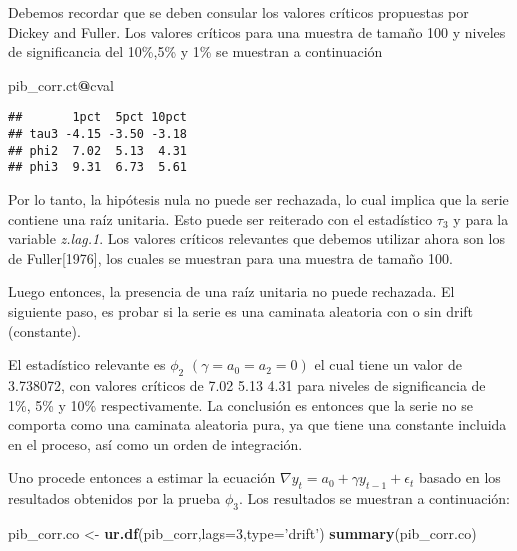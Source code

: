 \documentclass[]{book}
\newenvironment{Shaded}{\begin{snugshade}}{\end{snugshade}}
\newcommand{\KeywordTok}[1]{\textcolor[rgb]{0.13,0.29,0.53}{\textbf{#1}}}
\newcommand{\DataTypeTok}[1]{\textcolor[rgb]{0.13,0.29,0.53}{#1}}
\newcommand{\DecValTok}[1]{\textcolor[rgb]{0.00,0.00,0.81}{#1}}
\newcommand{\StringTok}[1]{\textcolor[rgb]{0.31,0.60,0.02}{#1}}
\newcommand{\OperatorTok}[1]{\textcolor[rgb]{0.81,0.36,0.00}{\textbf{#1}}}
\newcommand{\NormalTok}[1]{#1}
\theoremstyle{definition}
\theoremstyle{definition}
\theoremstyle{definition}
\theoremstyle{remark}
\begin{document}
Debemos recordar que se deben consular los valores críticos propuestas
por Dickey and Fuller. Los valores críticos para una muestra de tamaño
100 y niveles de significancia del 10\%,5\% y 1\% se muestran a
continuación

\begin{Shaded}
\begin{Highlighting}[]
\NormalTok{pib_corr.ct}\OperatorTok{@}\NormalTok{cval}
\end{Highlighting}
\end{Shaded}

\begin{verbatim}
##       1pct  5pct 10pct
## tau3 -4.15 -3.50 -3.18
## phi2  7.02  5.13  4.31
## phi3  9.31  6.73  5.61
\end{verbatim}

Por lo tanto, la hipótesis nula no puede ser rechazada, lo cual implica
que la serie contiene una raíz unitaria. Esto puede ser reiterado con el
estadístico \(\tau_3\) y para la variable \emph{z.lag.1}. Los valores
críticos relevantes que debemos utilizar ahora son los de
Fuller{[}1976{]}, los cuales se muestran para una muestra de tamaño 100.

Luego entonces, la presencia de una raíz unitaria no puede rechazada. El
siguiente paso, es probar si la serie es una caminata aleatoria con o
sin drift (constante).

El estadístico relevante es \(\phi_2\) \((\gamma=a_0=a_2=0)\) el cual
tiene un valor de 3.738072, con valores críticos de 7.02 5.13 4.31 para
niveles de significancia de 1\%, 5\% y 10\% respectivamente. La
conclusión es entonces que la serie no se comporta como una caminata
aleatoria pura, ya que tiene una constante incluida en el proceso, así
como un orden de integración.

Uno procede entonces a estimar la ecuación
\(\nabla y_t = a_0 + \gamma y_{t-1} + \epsilon_t\) basado en los
resultados obtenidos por la prueba \(\phi_3\). Los resultados se
muestran a continuación:

\begin{Shaded}
\begin{Highlighting}[]
\NormalTok{pib_corr.co <-}\StringTok{ }\KeywordTok{ur.df}\NormalTok{(pib_corr,}\DataTypeTok{lags=}\DecValTok{3}\NormalTok{,}\DataTypeTok{type=}\StringTok{'drift'}\NormalTok{)}
\KeywordTok{summary}\NormalTok{(pib_corr.co)}
\end{Highlighting}
\end{Shaded}
\end{document}
